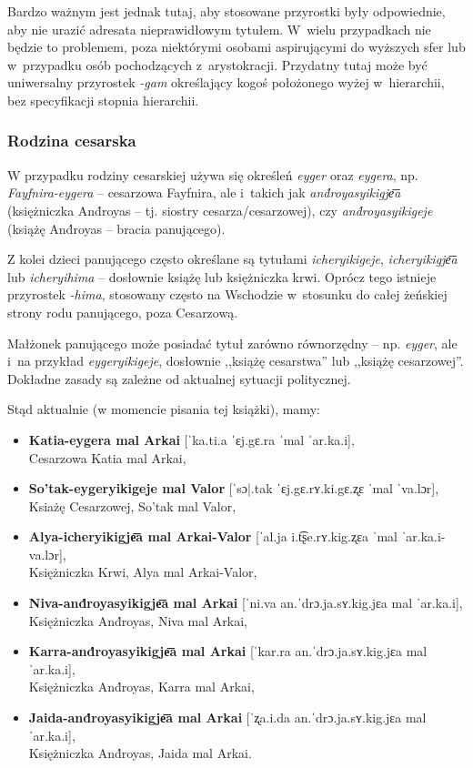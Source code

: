 \begin{spacing}{1.1}
Bardzo ważnym jest jednak tutaj, aby stosowane przyrostki były odpowiednie, aby
nie urazić adresata nieprawidłowym tytułem. W~wielu przypadkach nie będzie to
problemem, poza niektórymi osobami aspirującymi do wyższych sfer lub w~przypadku
osób pochodzących z~arystokracji. Przydatny tutaj może być uniwersalny 
przyrostek \emph{-gam} określający kogoś położonego wyżej w~hierarchii, bez
specyfikacji stopnia hierarchii.

\subsubsection{Rodzina cesarska}

W przypadku rodziny cesarskiej używa się określeń \emph{eyger} oraz 
\emph{eygera}, np. \emph{Fayfnira-eygera} -- cesarzowa Fayfnira, ale i~takich jak 
\emph{and́royasyikigje͞a} (księżniczka And́royas -- tj. siostry cesarza/cesarzowej),
czy \emph{and́royasyikigeje} (książę And́royas -- bracia panującego).

Z kolei dzieci panującego często określane są tytułami \emph{icheryikigeje}, 
\emph{icheryikigje͞a} lub \emph{icheryihima} -- dosłownie książę lub księżniczka 
krwi. Oprócz tego istnieje przyrostek \emph{-hima}, stosowany często na 
Wschodzie w~stosunku do całej żeńskiej strony rodu panującego, poza Cesarzową.

Małżonek panującego może posiadać tytuł zarówno równorzędny -- np. \emph{eyger},
ale i~na przykład \emph{eygeryikigeje}, dosłownie ,,książę cesarstwa'' lub 
,,książę cesarzowej''. Dokładne zasady są zależne od aktualnej sytuacji 
politycznej.

Stąd aktualnie (w momencie pisania tej książki), mamy:

\begin{itemize}
\item \textbf{Katia-eygera mal Arkai} [ˈka.ti.a ˈɛj.gɛ.ra ˈmal ˈar.ka.i],\\ 
Cesarzowa Katia mal Arkai,
\item \textbf{So'tak-eygeryikigeje mal Valor} [ˈsɔ|.tak ˈɛj.gɛ.rʏ.ki.gɛ.ʐɛ 
ˈmal ˈva.lɔr],\\ Ksiażę Cesarzowej, So'tak mal Valor,
\item \textbf{Alya-icheryikigje͞a mal Arkai-Valor} [ˈal.ja i.t͡ʂe.rʏ.kig.ʐɛa ˈmal 
ˈar.ka.i-va.lɔr],\\ Księżniczka Krwi, Alya mal Arkai-Valor,
\item \textbf{Niva-and́royasyikigje͞a mal Arkai} [ˈni.va an.ˈdrɔ.ja.sʏ.kig.jɛa 
mal ˈar.ka.i],\\ Księżniczka And́royas, Niva mal Arkai,
\item \textbf{Karra-and́royasyikigje͞a mal Arkai} [ˈkar.ra an.ˈdrɔ.ja.sʏ.kig.jɛa 
mal ˈar.ka.i],\\ Księżniczka And́royas, Karra mal Arkai,
\item \textbf{Jaida-and́royasyikigje͞a mal Arkai} [ˈʐa.i.da an.ˈdrɔ.ja.sʏ.kig.jɛa
mal ˈar.ka.i],\\ Księżniczka And́royas, Jaida mal Arkai.
\end{itemize}


\end{spacing}
